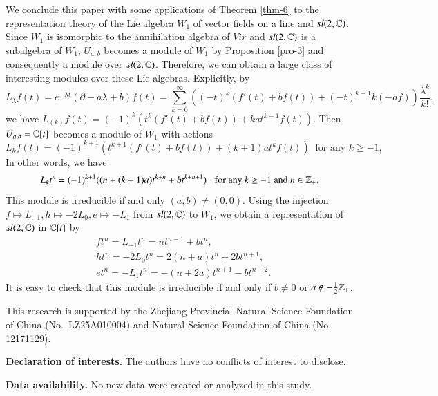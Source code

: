 \documentclass[12pt]{amsart}
\begin{document}
We conclude this paper with some applications of Theorem \ref{thm-6} to the representation theory of the Lie algebra $W_1$ of vector fields on a line and $sl(2,\mathbb{C})$. Since $W_1$ is isomorphic to the annihilation algebra of $Vir$ and $sl(2,\mathbb{C})$ is a subalgebra of $W_1$, $U_{a,b}$ becomes a module of $W_1$ by Proposition \ref{pro-3} and consequently a module over $sl(2,\mathbb{C})$. Therefore, we can obtain a large class of interesting modules over these Lie algebras.
Explicitly, by $$L_\lambda f(t)
=e^{-\lambda t}(\partial-a \lambda+b)f(t)=\sum_{k=0}^\infty((-t)^k(f'(t)+bf(t))+(-t)^{k-1}k(-af))\frac{\lambda^k}{k!},$$
we have $L_{(k)}f(t)=(-1)^k(t^k(f'(t)+bf(t))+kat^{k-1}f(t))$. Then $U_{a,b}=\mathbb{C}[t]$ becomes a module of $W_1$ with actions
$$L_{k}f(t)=(-1)^{k+1}(t^{k+1}(f'(t)+bf(t))+(k+1)at^{k}f(t))\;\;\text{for any $k\geq-1$,}$$ In other words, we have
$$L_{k}t^n=(-1)^{k+1}((n+(k+1)a)t^{k+n}+bt^{k+n+1})\;\;\;\text{for any $k\geq-1$ and $ n\in\mathbb{Z}_+$.}$$ This module is irreducible if and only $(a,b)\neq(0,0)$.
Using the injection $f\mapsto L_{-1}, h\mapsto -2L_0, e\mapsto -L_1$ from $sl(2,\mathbb{C})$ to $W_1$, we obtain a representation of $sl(2,\mathbb{C})$ in $\mathbb{C}[t]$ by
\begin{equation*}
\begin{aligned}
&f t^n =L_{-1}t^n=nt^{n-1}+bt^n, \\
&ht^n=-2L_0t^n=2(n+a)t^n+2bt^{n+1},\\
&et^n=-L_1t^n=-(n+2a)t^{n+1}-bt^{n+2}.
\end{aligned}
\end{equation*}
It is easy to check that this module is irreducible if and only if $b\neq0$ or $a\notin-\frac{1}{2}\mathbb{Z}_+$.

\smallskip
{} This research is supported by the Zhejiang
Provincial Natural Science Foundation of China (No.~LZ25A010004) and
Natural Science Foundation of China (No. 12171129).

\smallskip
\noindent
{\bf Declaration of interests. } The authors have no conflicts of interest to disclose.

\smallskip

\noindent
{\bf Data availability. } No new data were created or analyzed in this study.

\vspace{-.2cm}
\end{document}
